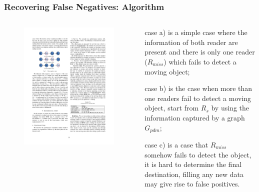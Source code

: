 
\begin{frame}
\frametitle{Recovering False Negatives: Algorithm}

\begin{columns}

  \begin{figure}[tb]
    \includegraphics[width=\columnwidth]{figures/3-3/3-3-11.pdf}
  \end{figure}

  \begin{fitemize}
  \item case a) is a simple case where the information of both reader are present and there is only one reader ($R_{miss}$) which fails to detect a moving object;
  \item case b) is the case when more than one readers fail to detect a moving object, start from $R_s$ by using the information captured by a graph $G_{pdm}$;
  \item case c) is a case that $R_{miss}$ somehow fails to detect the object, it is hard to determine the final destination, filling any new data may give rise to false positives.
  \end{fitemize}

\end{columns}

\end{frame}

